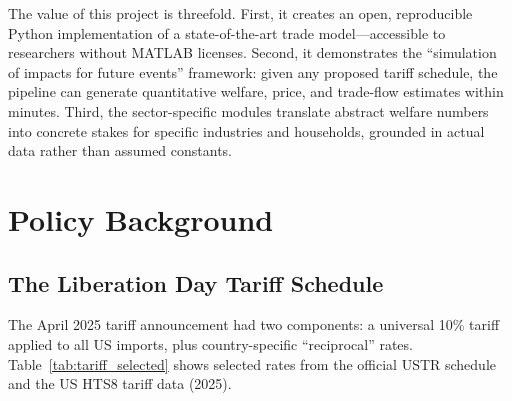 \documentclass[12pt]{article}
\begin{document}
The value of this project is threefold. First, it creates an open, reproducible
Python implementation of a state-of-the-art trade model---accessible to
researchers without MATLAB licenses. Second, it demonstrates the ``simulation
of impacts for future events'' framework: given any proposed tariff schedule,
the pipeline can generate quantitative welfare, price, and trade-flow estimates
within minutes. Third, the sector-specific modules translate abstract welfare
numbers into concrete stakes for specific industries and households, grounded
in actual data rather than assumed constants.

\section{Policy Background}

\subsection{The Liberation Day Tariff Schedule}

The April 2025 tariff announcement had two components: a universal 10\%
tariff applied to all US imports, plus country-specific ``reciprocal'' rates.
Table~\ref{tab:tariff_selected} shows selected rates from the official USTR
schedule and the US HTS8 tariff data (2025).
\end{document}
